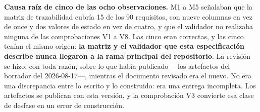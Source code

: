 \documentclass[11pt,a4paper]{article}
\begin{document}
\textbf{Causa raíz de cinco de las ocho observaciones.} M1 a M5 señalaban que la matriz de
trazabilidad cubría 15 de los 90 requisitos, con nueve columnas en vez de once y dos valores de
estado en vez de cuatro, y que el validador no realizaba ninguna de las comprobaciones V1 a V8.
Las cinco eran correctas, y las cinco tenían el mismo origen: \textbf{la matriz y el validador que
esta especificación describe nunca llegaron a la rama principal del repositorio}. La revisión se
hizo, con toda razón, sobre lo que había publicado ---los artefactos del borrador del
2026-08-17---, mientras el documento revisado era el nuevo. No era una discrepancia entre lo
escrito y lo construido: era una entrega incompleta. Los artefactos se publican con esta versión,
y la comprobación V3 convierte esa clase de desfase en un error de construcción.
\end{document}
